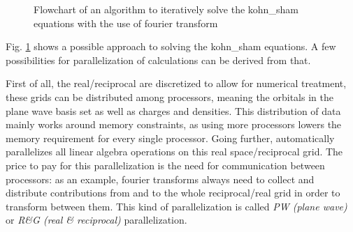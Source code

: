\documentclass[main.tex]{subfiles}
\begin{document}
\begin{figure}[htb!]
\label{fig:diagram-scf-calculations}
{}
\caption{Flowchart of an algorithm to iteratively solve the \acrshort{kohn_sham} equations with the use of fourier transform}
\end{figure}
Fig. \ref{fig:diagram-scf-calculations} shows a possible approach to solving the \acrshort{kohn_sham} equations.
A few possibilities for parallelization of calculations can be derived from that.

First of all, the real/reciprocal are discretized to allow for numerical treatment, these grids can be distributed among processors, meaning the orbitals in the plane wave basis set as well as charges and densities.
This distribution of data mainly works around memory constraints, as using more processors lowers the memory requirement for every single processor.
Going further, \QE automatically parallelizes all linear algebra operations on this real space/reciprocal grid.
The price to pay for this parallelization is the need for communication between processors: as an example, fourier transforms always need to collect and distribute contributions from and to the whole reciprocal/real grid in order to transform between them.
This kind of parallelization is called \emph{PW (plane wave)} or \emph{R\&G (real \& reciprocal)} parallelization. 
\end{document}
